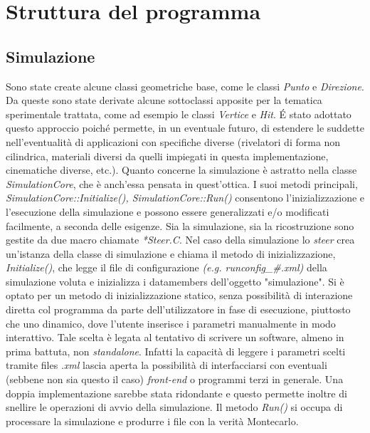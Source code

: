 \documentclass{article}
\begin{document}

\section{Struttura del programma}
\subsection{Simulazione}
Sono state create alcune classi geometriche base, come le classi \textit{Punto} e \textit{Direzione}.
Da queste sono state derivate alcune sottoclassi apposite per la tematica sperimentale trattata, come ad esempio le classi \textit{Vertice} e  \textit{Hit}.\newline
\'E stato adottato questo approccio poiché permette, in un eventuale futuro, di estendere le suddette nell'eventualità di applicazioni con specifiche diverse (rivelatori di forma non cilindrica, materiali diversi da quelli impiegati in questa implementazione, cinematiche diverse, etc.).\newline
Quanto concerne la simulazione è astratto nella classe \textit{SimulationCore}, che è anch'essa pensata in quest'ottica.
I suoi metodi principali, \textit{SimulationCore::Initialize(), SimulationCore::Run()} consentono l'inizializzazione e l'esecuzione della simulazione e possono essere generalizzati e/o modificati facilmente, a seconda delle esigenze.
Sia la simulazione, sia la ricostruzione sono gestite da due macro chiamate \textit{*Steer.C}.\newline
Nel caso della simulazione lo \textit{steer} crea un'istanza della classe di simulazione e chiama il metodo di inizializzazione, \textit{Initialize()}, che legge il file di configurazione \textit{(e.g. runconfig\_\#.xml)} della simulazione voluta e inizializza i datamembers dell'oggetto "simulazione".\newline
Si è optato per un metodo di inizializzazione statico, senza possibilità di interazione diretta col programma da parte dell'utilizzatore in fase di esecuzione, piuttosto che uno dinamico, dove l'utente inserisce i parametri manualmente in modo interattivo. Tale scelta è legata al tentativo di scrivere un software, almeno in prima battuta, non \textit{standalone}. Infatti la capacità di leggere i parametri scelti tramite files .\textit{xml} lascia aperta la possibilità di interfacciarsi con eventuali (sebbene non sia questo il caso) \textit{front-end} o programmi terzi in generale. 
Una doppia implementazione sarebbe stata ridondante e questo permette inoltre di snellire le operazioni di avvio della simulazione. \newline
Il metodo \textit{Run()} si occupa di processare la simulazione e produrre i file con la verità Montecarlo.
\end{document}
